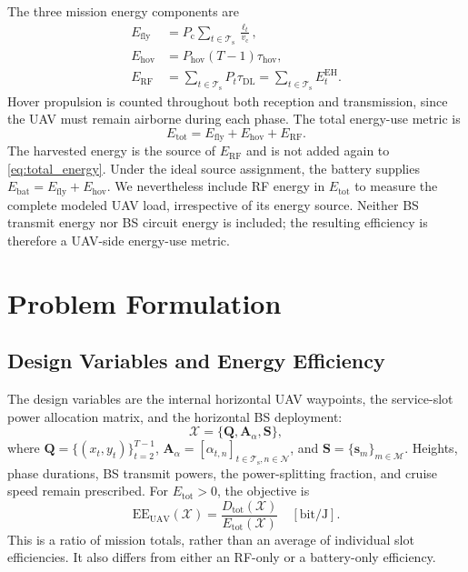 \documentclass[conference]{IEEEtran}
\newcommand{\EH}{\mathrm{EH}}
\newcommand{\DL}{\mathrm{DL}}
\newcommand{\RF}{\mathrm{RF}}
\newcommand{\fly}{\mathrm{fly}}
\newcommand{\hov}{\mathrm{hov}}
\newcommand{\tot}{\mathrm{tot}}
\newcommand{\setT}{\mathcal{T}_{\mathrm{s}}}
\newcommand{\setN}{\mathcal{N}}
\newcommand{\setM}{\mathcal{M}}
\begin{document}
The three mission energy components are
\begin{align}
E_{\fly}&=P_{\mathrm c}\sum_{t\in\setT}\frac{\ell_t}{v_{\mathrm c}},\label{eq:flight_energy}\\
E_{\hov}&=P_{\hov}(T-1)\tau_{\hov},\label{eq:hover_energy}\\
E_{\RF}&=\sum_{t\in\setT}P_t\tau_{\DL}
=\sum_{t\in\setT}E_t^{\EH}.
\label{eq:rf_energy}
\end{align}
Hover propulsion is counted throughout both reception and transmission, since the UAV must remain airborne during each phase. The total energy-use metric is
\begin{equation}
E_{\tot}=E_{\fly}+E_{\hov}+E_{\RF}.
\label{eq:total_energy}
\end{equation}
The harvested energy is the source of $E_{\RF}$ and is not added again to \cref{eq:total_energy}. Under the ideal source assignment, the battery supplies $E_{\mathrm{bat}}=E_{\fly}+E_{\hov}$. We nevertheless include RF energy in $E_{\tot}$ to measure the complete modeled UAV load, irrespective of its energy source. Neither BS transmit energy nor BS circuit energy is included; the resulting efficiency is therefore a UAV-side energy-use metric.

\section{Problem Formulation}
\label{subsec:problem_formulation}
\subsection{Design Variables and Energy Efficiency}
The design variables are the internal horizontal UAV waypoints, the service-slot power allocation matrix, and the horizontal BS deployment:
\begin{equation}
\mathcal X=\{\bm Q,\bm A_{\alpha},\bm S\},
\label{eq:variable_set}
\end{equation}
where $\bm Q=\{(x_t,y_t)\}_{t=2}^{T-1}$, $\bm A_{\alpha}=[\alpha_{t,n}]_{t\in\setT,n\in\setN}$, and $\bm S=\{\bm s_m\}_{m\in\setM}$. Heights, phase durations, BS transmit powers, the power-splitting fraction, and cruise speed remain prescribed. For $E_{\tot}>0$, the objective is
\begin{equation}
\mathrm{EE}_{\mathrm{UAV}}(\mathcal X)
=\frac{D_{\tot}(\mathcal X)}{E_{\tot}(\mathcal X)}
\quad[\mathrm{bit/J}].
\label{eq:ee_objective}
\end{equation}
This is a ratio of mission totals, rather than an average of individual slot efficiencies. It also differs from either an RF-only or a battery-only efficiency.
\end{document}
